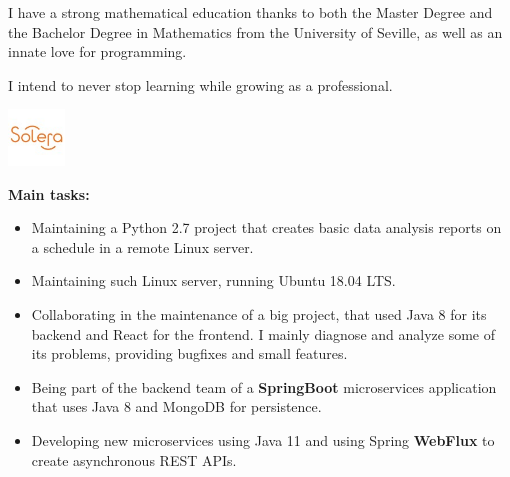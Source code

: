 \documentclass[10pt,a4paper]{altacv}
\begin{document}
\tagline{}

\begin{fullwidth}
\makecvheader
\end{fullwidth}

I have a strong mathematical education thanks to both the Master Degree and the Bachelor Degree in Mathematics from the University of Seville, as well as an innate love for programming.

I intend to never stop learning while growing as a professional. 
 
\begin{minipage}[t]{0.3\linewidth}
	\centering
  \includegraphics[width=15mm]{soleraInc.jpg}
\end{minipage}
\begin{minipage}[b]{0.69\linewidth}
\end{minipage}

\begin{small}
\textbf{Main tasks:}
\begin{itemize}
  \item Maintaining a Python 2.7 project that creates basic data analysis reports on a schedule in a remote Linux server.
  \item Maintaining such Linux server, running Ubuntu 18.04 LTS.
  \item {} Collaborating in the maintenance of a big project, that used Java 8 for its backend and React for the frontend. I mainly diagnose and analyze some of its problems, providing bugfixes and small features.
  \item {} Being part of the backend team of a \textbf{SpringBoot} microservices application that uses Java 8 and MongoDB for persistence.
  \item {} Developing new microservices using Java 11 and using Spring \textbf{WebFlux} to create asynchronous REST APIs.
\end{itemize}
\end{small}
\end{document}

